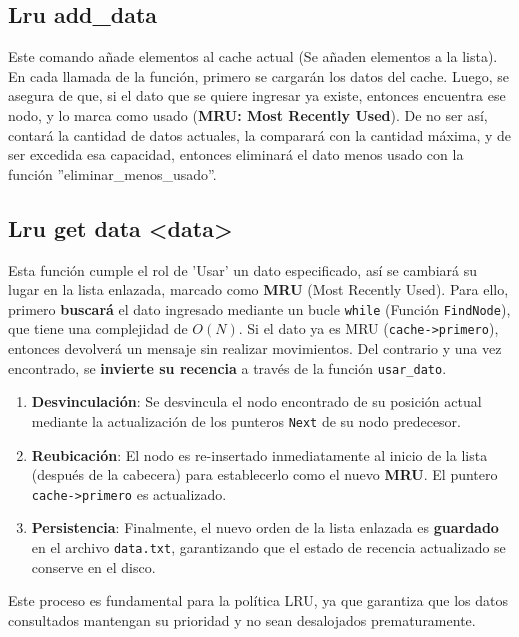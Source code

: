     \subsection{Lru add\_data} %
    Este comando añade elementos al cache actual (Se añaden elementos a la lista). En cada llamada de la función, primero se cargarán los datos del cache. 
    Luego, se asegura de que, si el dato que se quiere ingresar ya existe, entonces encuentra ese nodo, y lo marca como usado (\textbf{MRU: Most Recently Used}). 
    De no ser así, contará la cantidad de datos actuales, la comparará con la cantidad máxima, y de ser excedida esa capacidad, entonces eliminará el dato menos usado 
    con la función ''eliminar\_menos\_usado''.
    \subsection{Lru get data \textless data\textgreater}
    Esta función cumple el rol de 'Usar' un dato especificado, así se cambiará su lugar en la lista enlazada, marcado como \textbf{MRU} (Most Recently Used). 
    Para ello, primero \textbf{buscará} el dato ingresado mediante un bucle \texttt{while} (Función \texttt{FindNode}), que tiene una complejidad de $O(N)$. 
    Si el dato ya es MRU (\texttt{cache->primero}), entonces devolverá un mensaje sin realizar movimientos. Del contrario y una vez encontrado,
    se \textbf{invierte su recencia} a través de la función \texttt{usar\_dato}.
    \begin{enumerate}
        \item \textbf{Desvinculación}: Se desvincula el nodo encontrado de su posición actual mediante la actualización de los punteros \texttt{Next} de su nodo predecesor.
        \item \textbf{Reubicación}: El nodo es re-insertado inmediatamente al inicio de la lista (después de la cabecera) para establecerlo como el nuevo \textbf{MRU}. El puntero \texttt{cache->primero} es actualizado.
        \item \textbf{Persistencia}: Finalmente, el nuevo orden de la lista enlazada es \textbf{guardado} en el archivo \texttt{data.txt}, garantizando que el estado de recencia actualizado se conserve en el disco.
    \end{enumerate}
    Este proceso es fundamental para la política LRU, ya que garantiza que los datos consultados mantengan su prioridad y no sean desalojados prematuramente.

